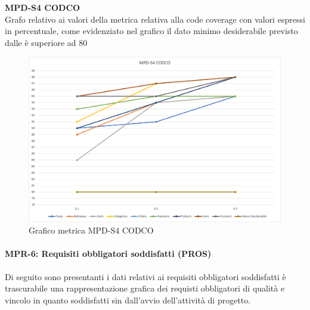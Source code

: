 \begin{center}
    \textbf{MPD-S4 CODCO} \\
    Grafo relativo ai valori della metrica relativa alla code coverage con valori espressi in percentuale, come evidenziato nel 
        grafico il dato minimo desiderabile previsto dalle  è superiore ad 80
        \begin{figure}[!htb]
        \centering
        \includegraphics[scale=0.50]{res/images/RQcodco.png}
        \caption{Grafico metrica MPD-S4 CODCO}
    \end{figure}
    \begin{center}
    \end{center}
\end{center}


\newpage
\paragraph{MPR-6: Requisiti obbligatori soddisfatti (PROS)}\label{_SV}
Di seguito sono presentanti i dati relativi ai requisiti obbligatori soddisfatti è trascurabile una rappresentazione grafica dei requisti obbligatori di 
qualità e vincolo in quanto soddisfatti sin dall'avvio dell'attività di progetto.

